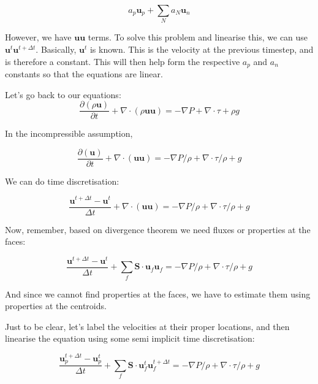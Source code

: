 \documentclass[masters]{ucbthesis}
\renewcommand{\_}{\kern-1.5pt\textunderscore\kern-1.5pt}
\begin{document}
$$a_p \mathbf{u}_p + \sum_N a_N \textbf{u}_n$$

However, we have $\mathbf{u u}$ terms. To solve this problem and linearise 
this, we can use $\mathbf{u}^t \mathbf{u}^{t + \Delta t}$. Basically, 
$\mathbf{u}^t$ is known. This is the velocity at the previous timestep,
and is therefore a constant. This will then help form the respective 
$a_p$ and $a_n$ constants so that the equations are linear.

Let's go back to our equations:
\begin{equation}
	\frac{\partial (\rho \textbf{u})}{\partial t} 
	+ \nabla \cdot (\rho \textbf{u} \textbf{u})
	= - \nabla P
	+ \nabla \cdot \tau 
	+ \rho g
\end{equation}

In the incompressible assumption,

\begin{equation}
	\frac{\partial (\textbf{u})}{\partial t} 
	+ \nabla \cdot (\textbf{u} \textbf{u})
	= - \nabla P/\rho
	+ \nabla \cdot \tau /\rho
	+ g
\end{equation}

We can do time discretisation:

\begin{equation}
	\frac{\textbf{u}^{t+ \Delta t} - \textbf{u}^t}{\Delta t} 
	+ \nabla \cdot (\textbf{u} \textbf{u})
	= - \nabla P/\rho
	+ \nabla \cdot \tau /\rho
	+ g
\end{equation}

Now, remember, based on divergence theorem we need fluxes or properties 
at the faces:

\begin{equation}
	\frac{\textbf{u}^{t+ \Delta t} - \textbf{u}^t}{\Delta t} 
	+ \sum_f \mathbf{S} \cdot \mathbf{u}_f \mathbf{u}_f
	= - \nabla P/\rho
	+ \nabla \cdot \tau /\rho
	+ g
\end{equation}

And since we cannot find properties at the faces, we have to estimate 
them using properties at the centroids.

Just to be clear, let's label the velocities at their proper locations,
and then linearise the equation using some semi implicit time 
discretisation:

\begin{equation}
	\frac{\textbf{u}^{t+ \Delta t}_p - \textbf{u}^t_p}{\Delta t} 
	+ \sum_f \mathbf{S} \cdot \mathbf{u}_f^t \mathbf{u}_f^{t + \Delta t} 
	= - \nabla P/\rho
	+ \nabla \cdot \tau /\rho
	+ g
\end{equation}
\end{document}
